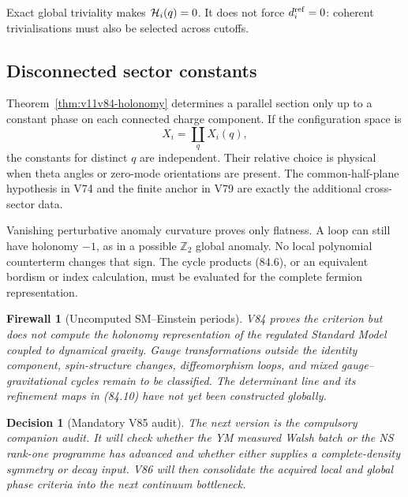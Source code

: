 \documentclass[11pt]{article}
\newtheorem{firewall}[theorem]{Firewall}
\newtheorem{decision}[theorem]{Decision}
\begin{document}
Exact global triviality makes \({\cal H}_i(q)=0\).  It does not force
\(d_i^{\rm ref}=0\): coherent trivialisations must also be selected
across cutoffs.

\subsection{Disconnected sector constants}

Theorem~\ref{thm:v11v84-holonomy} determines a parallel section only
up to a constant phase on each connected charge component.  If the
configuration space is
\[
                             X_i=\coprod_qX_i(q),             \tag{84.13}
\]
the constants for distinct \(q\) are independent.  Their relative
choice is physical when theta angles or zero-mode orientations are
present.  The common-half-plane hypothesis in V74 and the finite
anchor in V79 are exactly the additional cross-sector data.

\begin{warning}
\label{warn:v11v84-flat}
Vanishing perturbative anomaly curvature proves only flatness.
A loop can still have holonomy \(-1\), as in a possible
\(\mathbb Z_2\) global anomaly.  No local polynomial counterterm
changes that sign.  The cycle products (84.6), or an equivalent
bordism or index calculation, must be evaluated for the complete
fermion representation.
\end{warning}

\begin{firewall}[Uncomputed SM--Einstein periods]
\label{fire:v11v84-boundary}
V84 proves the criterion but does not compute the holonomy
representation of the regulated Standard Model coupled to dynamical
gravity.  Gauge transformations outside the identity component,
spin-structure changes, diffeomorphism loops, and mixed
gauge--gravitational cycles remain to be classified.  The determinant
line and its refinement maps in (84.10) have not yet been constructed
globally.
\end{firewall}

\begin{decision}[Mandatory V85 audit]
\label{dec:v11v84-next}
The next version is the compulsory companion audit.  It will check
whether the YM measured Walsh batch or the NS rank-one programme has
advanced and whether either supplies a complete-density symmetry or
decay input.  V86 will then consolidate the acquired local and global
phase criteria into the next continuum bottleneck.
\end{decision}
\end{document}
